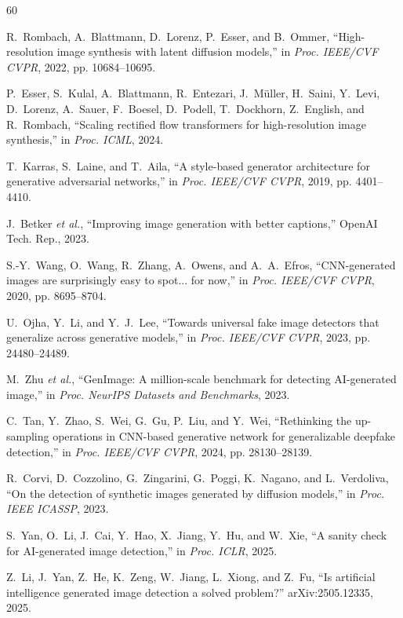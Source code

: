 \documentclass[journal]{IEEEtran}
\begin{document}
\begin{thebibliography}{60}

 R.~Rombach, A.~Blattmann, D.~Lorenz, P.~Esser, and B.~Ommer, ``High-resolution image synthesis with latent diffusion models,'' in \textit{Proc. IEEE/CVF CVPR}, 2022, pp. 10684--10695.

 P.~Esser, S.~Kulal, A.~Blattmann, R.~Entezari, J.~M\"uller, H.~Saini, Y.~Levi, D.~Lorenz, A.~Sauer, F.~Boesel, D.~Podell, T.~Dockhorn, Z.~English, and R.~Rombach, ``Scaling rectified flow transformers for high-resolution image synthesis,'' in \textit{Proc. ICML}, 2024.

 T.~Karras, S.~Laine, and T.~Aila, ``A style-based generator architecture for generative adversarial networks,'' in \textit{Proc. IEEE/CVF CVPR}, 2019, pp. 4401--4410.

 J.~Betker \textit{et al.}, ``Improving image generation with better captions,'' OpenAI Tech. Rep., 2023.

 S.-Y.~Wang, O.~Wang, R.~Zhang, A.~Owens, and A.~A.~Efros, ``CNN-generated images are surprisingly easy to spot... for now,'' in \textit{Proc. IEEE/CVF CVPR}, 2020, pp. 8695--8704.

 U.~Ojha, Y.~Li, and Y.~J.~Lee, ``Towards universal fake image detectors that generalize across generative models,'' in \textit{Proc. IEEE/CVF CVPR}, 2023, pp. 24480--24489.

 M.~Zhu \textit{et al.}, ``GenImage: A million-scale benchmark for detecting AI-generated image,'' in \textit{Proc. NeurIPS Datasets and Benchmarks}, 2023.

 C.~Tan, Y.~Zhao, S.~Wei, G.~Gu, P.~Liu, and Y.~Wei, ``Rethinking the up-sampling operations in CNN-based generative network for generalizable deepfake detection,'' in \textit{Proc. IEEE/CVF CVPR}, 2024, pp. 28130--28139.

 R.~Corvi, D.~Cozzolino, G.~Zingarini, G.~Poggi, K.~Nagano, and L.~Verdoliva, ``On the detection of synthetic images generated by diffusion models,'' in \textit{Proc. IEEE ICASSP}, 2023.

 S.~Yan, O.~Li, J.~Cai, Y.~Hao, X.~Jiang, Y.~Hu, and W.~Xie, ``A sanity check for AI-generated image detection,'' in \textit{Proc. ICLR}, 2025.

 Z.~Li, J.~Yan, Z.~He, K.~Zeng, W.~Jiang, L.~Xiong, and Z.~Fu, ``Is artificial intelligence generated image detection a solved problem?'' arXiv:2505.12335, 2025.


\end{thebibliography}
\end{document}
